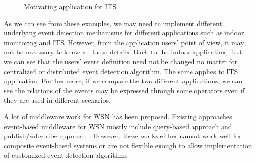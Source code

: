 \begin{figure}
\centering
{}
\caption{Motivating application for ITS}
\label{fig:its}
\end{figure}

As we can see from these examples, we may need to implement different underlying event detection mechanisms for different applications such as indoor monitoring and ITS. However, from the application users' point of view, it may not be necessary to know all these details. Back to the indoor application, first we can see that the users' event definition need not be changed no matter for centralized or distributed event detection algorithm. The same applies to ITS application. Further more, if we compare the two different applications, we can see the relations of the events may be expressed through some operators even if they are used in different scenarios. %

A lot of middleware work for WSN has been proposed. Existing approaches event-based middleware for WSN mostly include query-based approach \cite{tinydb} and publish/subscribe approach \cite{complexevent}. However, these works either cannot work well for composite event-based systems or are not flexible enough to allow implementation of customized event detection algorithms. 


 
